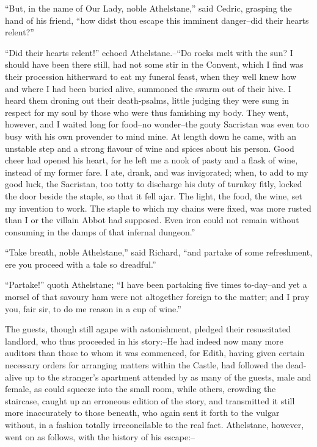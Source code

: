 ``But, in the name of Our Lady, noble Athelstane,'' said Cedric,
grasping the hand of his friend, ``how didst thou escape this imminent
danger--did their hearts relent?''

``Did their hearts relent!'' echoed Athelstane.--``Do rocks melt with
the sun? I should have been there still, had not some stir in the
Convent, which I find was their procession hitherward to eat my funeral
feast, when they well knew how and where I had been buried alive,
summoned the swarm out of their hive. I heard them droning out their
death-psalms, little judging they were sung in respect for my soul by
those who were thus famishing my body. They went, however, and I waited
long for food--no wonder--the gouty Sacristan was even too busy with his
own provender to mind mine. At length down he came, with an unstable
step and a strong flavour of wine and spices about his person. Good
cheer had opened his heart, for he left me a nook of pasty and a flask
of wine, instead of my former fare. I ate, drank, and was invigorated;
when, to add to my good luck, the Sacristan, too totty to discharge his
duty of turnkey fitly, locked the door beside the staple, so that it
fell ajar. The light, the food, the wine, set my invention to work. The
staple to which my chains were fixed, was more rusted than I or the
villain Abbot had supposed. Even iron could not remain without consuming
in the damps of that infernal dungeon.''

``Take breath, noble Athelstane,'' said Richard, ``and partake of some
refreshment, ere you proceed with a tale so dreadful.''

``Partake!'' quoth Athelstane; ``I have been partaking five times
to-day--and yet a morsel of that savoury ham were not altogether foreign
to the matter; and I pray you, fair sir, to do me reason in a cup of
wine.''

The guests, though still agape with astonishment, pledged their
resuscitated landlord, who thus proceeded in his story:--He had indeed
now many more auditors than those to whom it was commenced, for Edith,
having given certain necessary orders for arranging matters within the
Castle, had followed the dead-alive up to the stranger's apartment
attended by as many of the guests, male and female, as could squeeze
into the small room, while others, crowding the staircase, caught up an
erroneous edition of the story, and transmitted it still more
inaccurately to those beneath, who again sent it forth to the vulgar
without, in a fashion totally irreconcilable to the real fact.
Athelstane, however, went on as follows, with the history of his
escape:--

